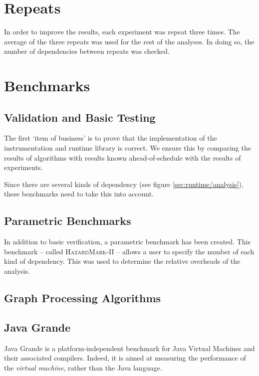 \section{Repeats} \label{sec:methodology/repeats}
In order to improve the results, each experiment was repeat three times. The average of the three repeats was used for the rest of the analyses. In doing so, the number of dependencies between repeats was checked.

\section{Benchmarks} \label{sec:methodology/benchmarks}
	\subsection{Validation and Basic Testing} \label{sec:methodology/benchmarks/simple}
	The first `item of business' is to prove that the implementation of the instrumentation and runtime library is correct. We ensure this by comparing the results of algorithms with results known ahead-of-schedule with the results of experiments.
	
	Since there are several kinds of dependency (see figure \ref{sec:runtime/analysis}), these benchmarks need to take this into account.
	
	\subsection{Parametric Benchmarks} \label{sec:methodology/benchmarks/parametric}
	In addition to basic verification, a parametric benchmark has been created. This benchmark -- called \textsc{HazardMark-II} -- allows a user to specify the number of each kind of dependency. This was used to determine the relative overheads of the analysis.
	
	\subsection{Graph Processing Algorithms} \label{sec:methodology/benchmarks/graphs}
	
	\subsection{Java Grande} \label{sec:methodology/benchmarks/grande}
	Java Grande \citep{Smith2001,Bull2001} is a platform-independent benchmark for Java Virtual Machines and their associated compilers. Indeed, it is aimed at measuring the performance of the \emph{virtual machine}, rather than the Java language.
	
